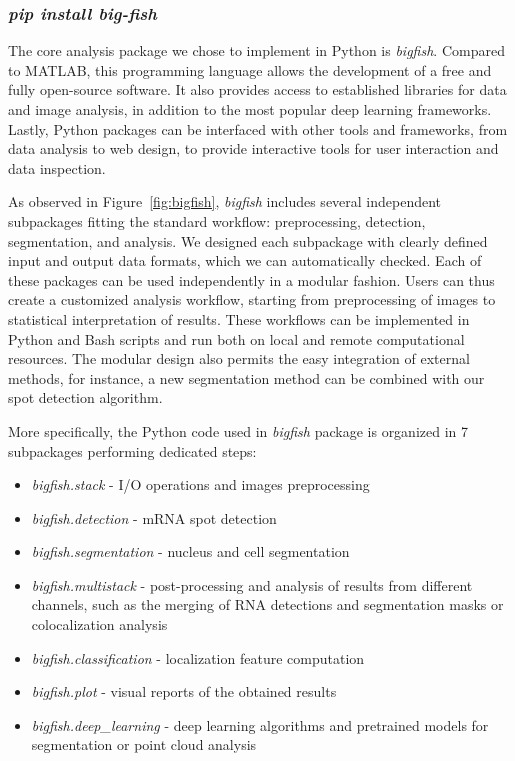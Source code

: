 \subsubsection{\emph{pip install big-fish}}

The core analysis package we chose to implement in Python is \emph{bigfish}.
Compared to MATLAB, this programming language allows the development of a free and fully open-source software.
It also provides access to established libraries for data and image analysis, in addition to the most popular deep learning frameworks.
Lastly, Python packages can be interfaced with other tools and frameworks, from data analysis to web design, to provide interactive tools for user interaction and data inspection.

As observed in Figure~\ref{fig:bigfish}, \emph{bigfish} includes several independent subpackages fitting the standard workflow: preprocessing, detection, segmentation, and analysis.
We designed each subpackage with clearly defined input and output data formats, which we can automatically checked.
Each of these packages can be used independently in a modular fashion.
Users can thus create a customized analysis workflow, starting from preprocessing of images to statistical interpretation of results.
These workflows can be implemented in Python and Bash scripts and run both on local and remote computational resources.
The modular design also permits the easy integration of external methods, for instance, a new segmentation method can be combined with our spot detection algorithm.

More specifically, the Python code used in \emph{bigfish} package is organized in 7 subpackages performing dedicated steps:
\begin{itemize}
	\setlength\itemsep{0.1em}
	\item \emph{bigfish.stack} - I/O operations and images preprocessing
	\item \emph{bigfish.detection} - \ac{mRNA} spot detection
	\item \emph{bigfish.segmentation} - nucleus and cell segmentation
	\item \emph{bigfish.multistack} - post-processing and analysis of results from different channels, such as the merging of \ac{RNA} detections and segmentation masks or colocalization analysis
	\item \emph{bigfish.classification} - localization feature computation
	\item \emph{bigfish.plot} - visual reports of the obtained results
	\item \emph{bigfish.deep\_learning} - deep learning algorithms and pretrained models for segmentation or point cloud analysis
\end{itemize}


